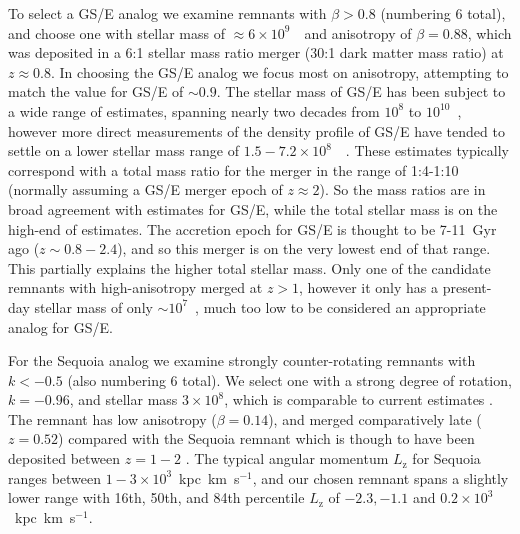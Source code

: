 To select a GS/E analog we examine remnants with $\beta > 0.8$ (numbering 6 total), and choose one with stellar mass of $\approx 6\times10^{9}$~\Msun\ and anisotropy of $\beta=0.88$, which was deposited in a 6:1 stellar mass ratio merger (30:1 dark matter mass ratio) at $z \approx 0.8$. In choosing the GS/E analog we focus most on anisotropy, attempting to match the value for GS/E of $\sim 0.9$. The stellar mass of GS/E has been subject to a wide range of estimates, spanning nearly two decades from $10^{8}$ to $10^{10}$~\Msun, however more direct measurements of the density profile of GS/E have tended to settle on a lower stellar mass range of $1.5-7.2\times10^{8}$~\Msun\ \parencite{mackereth20,han22,lane23}. These estimates typically correspond with a total mass ratio for the merger in the range of 1:4-1:10 (normally assuming a GS/E merger epoch of $z\approx2$). So the mass ratios are in broad agreement with estimates for GS/E, while the total stellar mass is on the high-end of estimates. The accretion epoch for GS/E is thought to be 7-11~Gyr ago ($z \sim 0.8-2.4$), and so this merger is on the very lowest end of that range. This partially explains the higher total stellar mass. Only one of the candidate remnants with high-anisotropy merged at $z>1$, however it only has a present-day stellar mass of only $\sim 10^{7}$~\Msun, much too low to be considered an appropriate analog for GS/E.

For the Sequoia analog we examine strongly counter-rotating remnants with $k < -0.5$ (also numbering 6 total). We select one with a strong degree of rotation, $k=-0.96$, and stellar mass $3\times10^{8}$, which is comparable to current estimates \parencite{myeong19,matsuno19,naidu20}. The remnant has low anisotropy ($\beta=0.14$), and merged comparatively late ($z=0.52$) compared with the Sequoia remnant which is though to have been deposited between $z=1-2$ \parencite{kruijssen20}. The typical angular momentum $L_\mathrm{z}$ for Sequoia ranges between $1-3 \times 10^{3}$~kpc~km~s$^{-1}$, and our chosen remnant spans a slightly lower range with 16th, 50th, and 84th percentile $L_\mathrm{z}$ of $-2.3,-1.1$ and $0.2\times 10^{3}$~kpc~km~s$^{-1}$.

